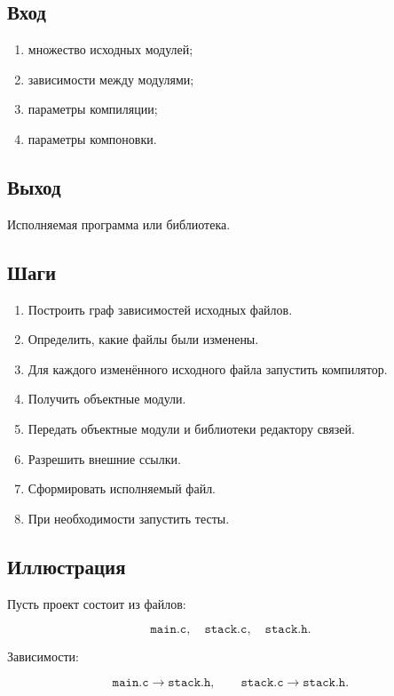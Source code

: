 \documentclass[12pt,a4paper]{article}
\begin{document}
\subsection*{Вход}

\begin{enumerate}
  \item множество исходных модулей;
  \item зависимости между модулями;
  \item параметры компиляции;
  \item параметры компоновки.
\end{enumerate}

\subsection*{Выход}

Исполняемая программа или библиотека.

\subsection*{Шаги}

\begin{enumerate}
  \item Построить граф зависимостей исходных файлов.
  \item Определить, какие файлы были изменены.
  \item Для каждого изменённого исходного файла запустить компилятор.
  \item Получить объектные модули.
  \item Передать объектные модули и библиотеки редактору связей.
  \item Разрешить внешние ссылки.
  \item Сформировать исполняемый файл.
  \item При необходимости запустить тесты.
\end{enumerate}

\subsection*{Иллюстрация}

Пусть проект состоит из файлов:

\[
\texttt{main.c},\quad \texttt{stack.c},\quad \texttt{stack.h}.
\]

Зависимости:

\[
\texttt{main.c} \rightarrow \texttt{stack.h},
\qquad
\texttt{stack.c} \rightarrow \texttt{stack.h}.
\]
\end{document}
